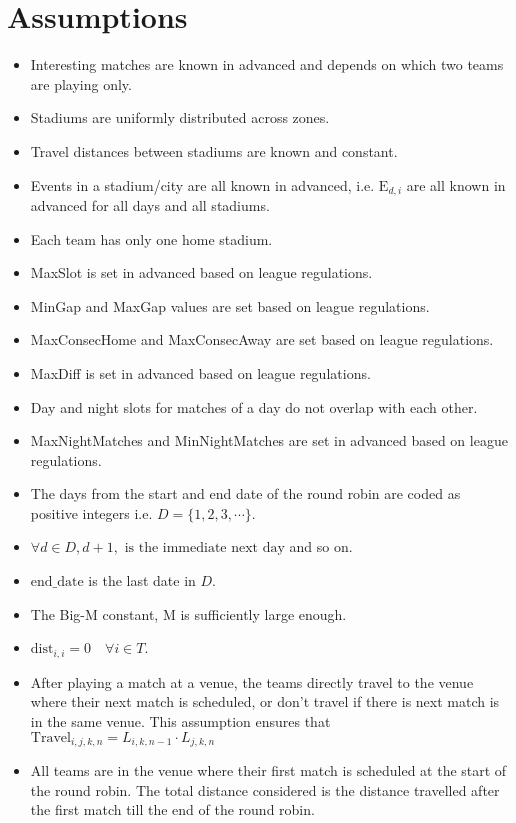 \documentclass[a4paper, 12pt]{article}
\begin{document}
\section*{Assumptions}
\begin{itemize}
    \item Interesting matches are known in advanced and depends on which two teams are playing only.
    \item Stadiums are uniformly distributed across zones.
    \item Travel distances between stadiums are known and constant.
    \item Events in a stadium/city are all known in advanced, i.e. $\text{E}_{d,i}$ are all known in advanced for all days and all stadiums.
    \item Each team has only one home stadium.
    \item MaxSlot is set in advanced based on league regulations.
    \item MinGap and MaxGap values are set based on league regulations.
    \item MaxConsecHome and MaxConsecAway are set based on league regulations.
    \item MaxDiff is set in advanced based on league regulations.
    \item Day and night slots for matches of a day do not overlap with each other.
    \item MaxNightMatches and MinNightMatches are set in advanced based on league regulations.
    \item The days from the start and end date of the round robin are coded as positive integers i.e. $D = \{1,2,3, \cdots \}$.
    \item $\forall d \in D, d+1, \text{ is the immediate next day}$ and so on. 
    \item $\text{end\_date}$ is the last date in $D$.
    \item The Big-M constant, M is sufficiently large enough.
    \item $\text{dist}_{i,i} = 0 \quad \forall i \in T$.
    \item After playing a match at a venue, the teams directly travel to the venue where their next match is scheduled, or don't travel if there is next match is in the same venue. This assumption ensures that $\text{Travel}_{i,j,k,n} = L_{i,k,n-1}\cdot L_{j,k,n}$
    \item All teams are in the venue where their first match is scheduled at the start of the round robin. The total distance considered is the distance travelled after the first match till the end of the round robin. 
\end{itemize}
\end{document}
